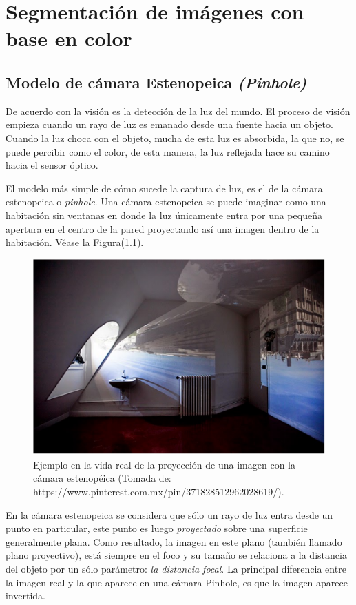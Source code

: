 \documentclass{book}
\begin{document}
\chapter{ Segmentación de imágenes con base en color}
\section{Modelo de cámara Estenopeica \textit{(Pinhole)}}
De acuerdo con \cite{bradski2008learning} la visión es la detección de la luz del mundo. El proceso de visión empieza cuando un rayo de luz es emanado desde una fuente hacia un objeto. Cuando la luz choca con el objeto, mucha de esta luz es absorbida, la que no, se puede percibir como el color, de esta manera, la luz reflejada hace su camino hacia el sensor óptico.

El modelo más simple de cómo sucede la captura de luz, es el de la cámara estenopeica o \textit{pinhole}. Una cámara estenopeica se puede imaginar como una habitación sin ventanas en donde la luz únicamente entra por una pequeña apertura en el centro de la pared proyectando así una imagen dentro de la habitación. Véase la Figura(\ref{fig:pinholeCamera}).

\begin{figure}
	\centering		
	\includegraphics[scale=0.7]{images/pinholeCamera.pdf}
	\caption{Ejemplo en la vida real de la proyección de una imagen con la cámara estenopéica (Tomada de: https://www.pinterest.com.mx/pin/371828512962028619/).}		
	\label{fig:pinholeCamera}
\end{figure}

En la cámara estenopeica se considera que sólo un rayo de luz entra desde un punto en particular, este punto es luego \textit{proyectado} sobre una superficie generalmente plana. Como resultado, la imagen en este plano (también llamado plano proyectivo), está siempre en el foco y su tamaño se relaciona a la distancia del objeto por un sólo parámetro: \textit{la distancia focal}. La principal diferencia entre la imagen real y la que aparece en una cámara Pinhole, es que la imagen aparece invertida. 
	
\end{document}
